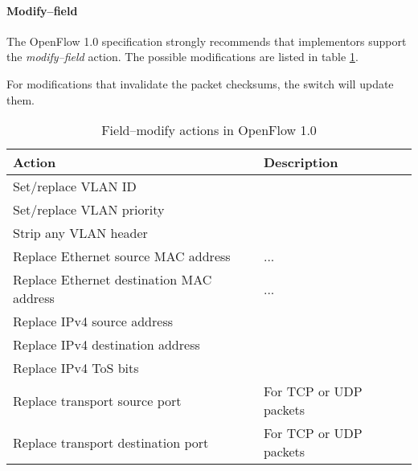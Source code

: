 \paragraph{Modify--field}

The OpenFlow 1.0 specification strongly recommends that implementors support
the {\em modify--field} action.  The possible modifications are listed in
table \ref{table:openflow-1.0.mods}.

For modifications that invalidate the packet checksums, the switch will
update them.

\begin{table}[!htp]
\begin{tabular}{|l|l|}
\hline \textbf{Action} & \textbf{Description} \\
\hline Set/replace VLAN ID & \\
\hline Set/replace VLAN priority & \\
\hline Strip any VLAN header & \\
\hline Replace Ethernet source MAC address & ... \\
\hline Replace Ethernet destination MAC address & ... \\
\hline Replace IPv4 source address & \\
\hline Replace IPv4 destination address & \\
\hline Replace IPv4 ToS bits & \\
\hline Replace transport source port & For TCP or UDP packets \\
\hline Replace transport destination port & For TCP or UDP packets \\
\hline
\end{tabular}
\label{table:openflow-1.0.mods}
\caption{Field--modify actions in OpenFlow 1.0}
\end{table}

